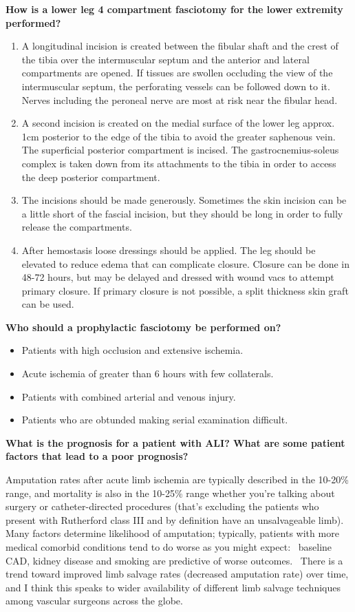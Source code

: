 \documentclass[
]{book}
\begin{document}
\textbf{How is a lower leg 4 compartment fasciotomy for the lower extremity
performed?}

\begin{enumerate}
\def\labelenumi{\arabic{enumi}.}
\item
  A longitudinal incision is created between the fibular shaft and the
  crest of the tibia over the intermuscular septum and the anterior
  and lateral compartments are opened. If tissues are swollen
  occluding the view of the intermuscular septum, the perforating
  vessels can be followed down to it. Nerves including the peroneal
  nerve are most at risk near the fibular head.
\item
  A second incision is created on the medial surface of the lower leg
  approx. 1cm posterior to the edge of the tibia to avoid the greater
  saphenous vein. The superficial posterior compartment is incised.
  The gastrocnemius-soleus complex is taken down from its attachments
  to the tibia in order to access the deep posterior compartment.~
\item
  The incisions should be made generously. Sometimes the skin incision
  can be a little short of the fascial incision, but they should be
  long in order to fully release the compartments.
\item
  After hemostasis loose dressings should be applied. The leg
  should be elevated to reduce edema that can complicate closure.
  Closure can be done in 48-72 hours, but may be delayed and dressed
  with wound vacs to attempt primary closure. If primary closure is
  not possible, a split thickness skin graft can be used.
\end{enumerate}

\textbf{Who should a prophylactic fasciotomy be performed on?}

\begin{itemize}
\item
  Patients with high occlusion and extensive ischemia. ~
\item
  Acute ischemia of greater than 6 hours with few collaterals.
\item
  Patients with combined arterial and venous injury.
\item
  Patients who are obtunded making serial examination difficult.
\end{itemize}

\textbf{What is the prognosis for a patient with ALI? What are some patient
factors that lead to a poor prognosis?}

Amputation rates after acute limb ischemia are typically described in
the 10-20\% range, and mortality is also in the 10-25\% range whether
you're talking about surgery or catheter-directed procedures (that's
excluding the patients who present with Rutherford class III and by
definition have an unsalvageable limb).~ Many factors determine
likelihood of amputation; typically, patients with more medical comorbid
conditions tend to do worse as you might expect:~ baseline CAD, kidney
disease and smoking are predictive of worse outcomes.~ There is a trend
toward improved limb salvage rates (decreased amputation rate) over
time, and I think this speaks to wider availability of different limb
salvage techniques among vascular surgeons across the globe.
\end{document}

